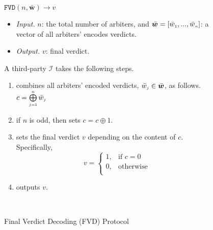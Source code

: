 \begin{figure}[!ht]
\setlength{\fboxsep}{0.7pt}
\begin{center}
\begin{boxedminipage}{12.3cm}
\small{
\underline{$\mathtt{FVD}(n,  \bar{\bm w})\rightarrow  v$}\\
%
\begin{itemize}
\item \noindent\textit{Input.} $n$:  the total number of  arbiters,  and  $\bar{\bm w}=[\bar{ w}_{\scriptscriptstyle 1},..., \bar{ w}_{\scriptscriptstyle n}]$:  a vector of all arbiters' encodes  verdicts.
%
\item \noindent\textit{Output.} $v$: final verdict.  
%
\end{itemize}
A third-party $\mathcal{I}$ takes the following steps.
\begin{enumerate}
%
%
\item combines  all arbiters' encoded verdicts, $\bar w_{\scriptscriptstyle j}\in \bar{\bm {w}}$, as follows. 
%
$c= \bigoplus\limits^{\scriptscriptstyle n}_{\scriptscriptstyle j=1} \bar w_{\scriptscriptstyle j}$
%
\item if $n$ is odd, then sets $c=c\oplus 1$. 
%
\item sets the final verdict $v$ depending on the content of $c$. Specifically, 
%
\begin{equation*}
   v= 
\begin{cases}
    1,              &\text{if } c= 0\\
   0 ,& \text{otherwise }\\

\end{cases}
\end{equation*}
%
\item outputs  $v$. 

\
 \end{enumerate}
 
}
\end{boxedminipage}
\end{center}
\caption{Final Verdict Decoding  (FVD) Protocol} 
\label{fig:FVD}
\end{figure}

